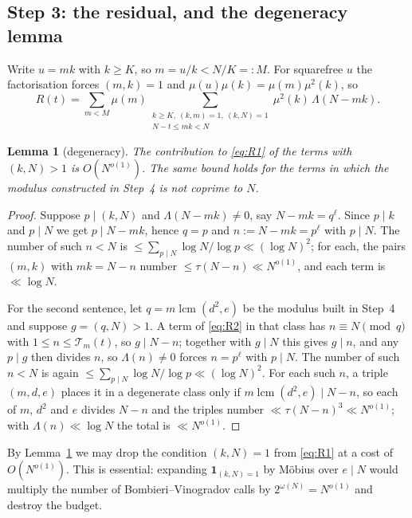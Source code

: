 \documentclass[11pt,a4paper]{article}
\theoremstyle{plain}
\newtheorem{lemma}[theorem]{Lemma}
\theoremstyle{definition}
\theoremstyle{remark}
\newcommand{\Tcut}{\mathcal T}
\DeclareMathOperator{\lcm}{lcm}
\begin{document}
\subsection{Step 3: the residual, and the degeneracy lemma}

Write $u=mk$ with $k\ge K$, so $m=u/k<N/K=:M$. For squarefree $u$ the
factorisation forces $(m,k)=1$ and $\mu(u)\mu(k)=\mu(m)\mu^2(k)$, so
\begin{equation}\label{eq:R1}
  R(t)=\sum_{m<M}\mu(m)
      \sum_{\substack{k\ge K,\ (k,m)=1,\ (k,N)=1\\ N-t\le mk<N}}
      \mu^2(k)\,\Lambda(N-mk).
\end{equation}

\begin{lemma}[degeneracy]\label{lem:degen}
The contribution to \eqref{eq:R1} of the terms with $(k,N)>1$ is
$O(N^{o(1)})$. The same bound holds for the terms in which the modulus
constructed in Step~4 is not coprime to $N$.
\end{lemma}

\begin{proof}
Suppose $p\mid(k,N)$ and $\Lambda(N-mk)\ne0$, say $N-mk=q^\ell$. Since
$p\mid k$ and $p\mid N$ we get $p\mid N-mk$, hence $q=p$ and
$n:=N-mk=p^\ell$ with $p\mid N$. The number of such $n<N$ is
$\le\sum_{p\mid N}\log N/\log p\ll(\log N)^2$; for each, the pairs
$(m,k)$ with $mk=N-n$ number $\le\tau(N-n)\ll N^{o(1)}$, and each term
is $\ll\log N$.

For the second sentence, let $q=m\lcm(d^2,e)$ be the modulus built in
Step~4 and suppose $g=(q,N)>1$. A term of \eqref{eq:R2} in that class
has $n\equiv N\pmod q$ with $1\le n\le\Tcut_m(t)$, so $g\mid N-n$;
together with $g\mid N$ this gives $g\mid n$, and any $p\mid g$ then
divides $n$, so $\Lambda(n)\ne0$ forces $n=p^\ell$ with $p\mid N$. The
number of such $n<N$ is again $\le\sum_{p\mid N}\log N/\log p
\ll(\log N)^2$. For each such $n$, a triple $(m,d,e)$ places it in a
degenerate class only if $m\lcm(d^2,e)\mid N-n$, so each of $m$, $d^2$
and $e$ divides $N-n$ and the triples number
$\ll\tau(N-n)^3\ll N^{o(1)}$; with $\Lambda(n)\ll\log N$ the total is
$\ll N^{o(1)}$.
\end{proof}

By Lemma~\ref{lem:degen} we may drop the condition $(k,N)=1$ from
\eqref{eq:R1} at a cost of $O(N^{o(1)})$. This is essential: expanding
$\mathbf 1_{(k,N)=1}$ by M\"obius over $e\mid N$ would multiply the
number of Bombieri--Vinogradov calls by $2^{\omega(N)}=N^{o(1)}$ and
destroy the budget.
\end{document}
